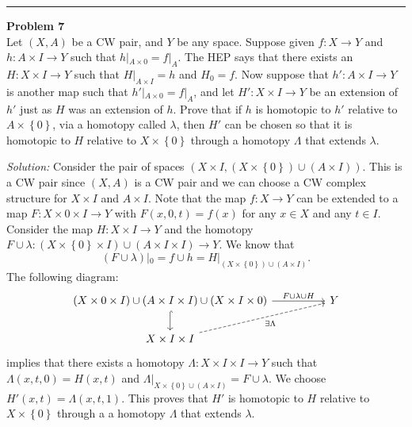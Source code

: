 \documentclass[a4paper, 12pt]{article}
\newenvironment{problem}[2][Problem]
    { \begin{mdframed}[backgroundcolor=gray!20] \textbf{#1 #2} \\}
    {  \end{mdframed}}
\newenvironment{solution}
    {\textit{Solution:}}
    {}
\begin{document}
\noindent\rule{7in}{2.8pt}
\begin{problem}{7}
Let \((X,A)\) be a CW pair, and \(Y\) be any space. Suppose given \(f:X\rightarrow Y\) and \(h:A\times I\rightarrow Y\) such that \(h|_{A\times 0}=f|_A\). The HEP says that 
there exists an \(H:X\times I\rightarrow Y\) such that \(H|_{A\times I}=h\) and \(H_0=f\). Now suppose that \(h':A\times I\rightarrow Y\) is another map such that \(h'|_{A\times 0}=f|_A\), and let 
\(H':X\times I\rightarrow Y\) be an extension of \(h'\) just as \(H\) was an extension of \(h\). Prove that if \(h\) is homotopic to \(h'\) relative to \(A\times \left\{ 0 \right\}\), via a homotopy called \(\lambda\), then 
\(H'\) can be chosen so that it is homotopic to \(H\) relative to \(X\times \left\{ 0 \right\}\) through a homotopy \(\Lambda\) that extends \(\lambda\).
\end{problem}
\begin{solution}
Consider the pair of spaces \((X\times I, (X\times \left\{ 0 \right\})\cup(A\times I))\). This is a CW pair since \((X,A)\) is a CW pair and we can choose a CW complex structure for \(X\times I\) and \(A\times I\). Note 
that the map \(f:X\rightarrow Y\) can be extended to a map \(F:X\times 0\times I\rightarrow Y\) with \(F(x,0,t)=f(x)\) for any \(x\in X\) and any \(t\in I\). Consider the map 
\(H:X\times I\rightarrow Y\) and the homotopy \(F\cup \lambda: (X\times \left\{ 0 \right\}\times I)\cup (A\times I\times I)\rightarrow Y\). We know that 
\[(F\cup \lambda)|_0=f\cup h=H|_{(X\times \left\{ 0 \right\})\cup (A\times I)}.\]
The following diagram:
\[\begin{tikzcd}
	{(X\times 0\times I)\cup(A\times I\times I)\cup(X\times I\times 0)} && Y \\
	{X\times I\times I}
	\arrow["{F\cup \lambda\cup H}", from=1-1, to=1-3]
	\arrow[hook, from=1-1, to=2-1]
	\arrow["{\exists \Lambda}"', dashed, from=2-1, to=1-3]
\end{tikzcd}\]
implies that there exists a homotopy \(\Lambda:X\times I\times I\rightarrow Y\) such that \(\Lambda(x,t,0)=H(x,t)\) and \(\Lambda|_{X\times \left\{ 0 \right\}\cup (A\times I)}=F\cup \lambda\). We choose \(H'(x,t)=\Lambda(x,t,1)\). 
This proves that \(H'\) is homotopic to \(H\) relative to \(X\times \left\{ 0 \right\}\) through a a homotopy \(\Lambda\) that extends \(\lambda\).
\end{solution}
\end{document}
